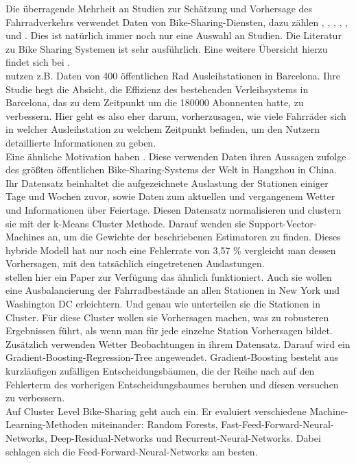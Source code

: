\documentclass[a4paper,12pt]{thesis}
\begin{document}
Die überragende Mehrheit an Studien zur Schätzung und Vorhersage des Fahrradverkehrs verwendet Daten von Bike-Sharing-Diensten, dazu zählen \cite{Kaltenbrunner2010}, \cite{Xu2013}, \cite{Li2015}, \cite{Mitchell2018PredictingBT}, \cite{Colace2020}, \cite{Gao2022} und \cite{Li2022}. Dies ist natürlich immer noch nur eine Auswahl an Studien. Die Literatur zu Bike Sharing Systemen ist sehr ausführlich. Eine weitere Übersicht hierzu findet sich bei \cite{Mitchell2018PredictingBT}.\\
\cite{Kaltenbrunner2010} nutzen z.B. Daten von 400 öffentlichen Rad Ausleihstationen in Barcelona. Ihre Studie hegt die Absicht, die Effizienz des bestehenden Verleihsystems in Barcelona, das zu dem Zeitpunkt um die 180000 Abonnenten hatte, zu verbessern. Hier geht es also eher darum, vorherzusagen, wie viele Fahrräder sich in welcher Ausleihstation zu welchem Zeitpunkt befinden, um den Nutzern detaillierte Informationen zu geben.\\
Eine ähnliche Motivation haben \cite{Xu2013}. Diese verwenden Daten ihren Aussagen zufolge des größten öffentlichen Bike-Sharing-Systems der Welt in Hangzhou in China. Ihr Datensatz beinhaltet die aufgezeichnete Auslastung der Stationen einiger Tage und Wochen zuvor, sowie Daten zum aktuellen und vergangenem Wetter und Informationen über Feiertage. Diesen Datensatz normalisieren und clustern sie mit der k-Means Cluster Methode. Darauf wenden sie Support-Vector-Machines an, um die Gewichte der beschriebenen Estimatoren zu finden. Dieses hybride Modell hat nur noch eine Fehlerrate von 3,57 \% vergleicht man dessen Vorhersagen, mit den tatsächlich eingetretenen Auslastungen.\\
\cite{Li2015} stellen hier ein Paper zur Verfügung das ähnlich funktioniert. Auch sie wollen eine Ausbalancierung der Fahrradbestände an allen Stationen in New York und Washington DC erleichtern. Und genau wie \cite{Xu2013} unterteilen sie die Stationen in Cluster. Für diese Cluster wollen sie Vorhersagen machen, was zu robusteren Ergebnissen führt, als wenn man für jede einzelne Station Vorhersagen bildet. Zusätzlich verwenden \cite{Li2015} Wetter Beobachtungen in ihrem Datensatz. Darauf wird ein Gradient-Boosting-Regression-Tree angewendet. Gradient-Boosting besteht aus kurzläufigen zufälligen Entscheidungsbäumen, die der Reihe nach auf den Fehlerterm des vorherigen Entscheidungsbaumes beruhen und diesen versuchen zu verbessern.\\
Auf Cluster Level Bike-Sharing geht auch \cite{Mitchell2018PredictingBT} ein. Er evaluiert verschiedene Machine-Learning-Methoden miteinander: Random Forests, Fast-Feed-Forward-Neural-Networks, Deep-Residual-Networks und Recurrent-Neural-Networks.  Dabei schlagen sich die Feed-Forward-Neural-Networks am besten.\\
\end{document}
